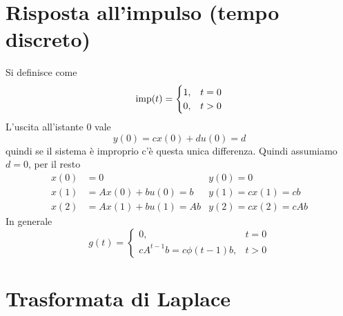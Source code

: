 \section{Risposta all'impulso (tempo discreto)}

Si definisce come
\begin{equation*}
	\operatorname{imp}(t) =\begin{cases}
	1, & t=0\\
	0, & t >0
	\end{cases}
\end{equation*}
L'uscita all'istante $0$ vale
\begin{equation*}
	y(0) =cx(0) +du(0) =d
\end{equation*}
quindi se il sistema è improprio c'è questa unica differenza. Quindi assumiamo $d=0$, per il resto
\begin{equation*}
	\begin{aligned}
		x(0) & =0                & y(0) =0          \\
		x(1) & =Ax(0) +bu(0) =b  & y(1) =cx(1) =cb  \\
		x(2) & =Ax(1) +bu(1) =Ab & y(2) =cx(2) =cAb 
	\end{aligned}
\end{equation*}
In generale
\begin{equation*}
	\boxed{g(t) =\begin{cases}
		0, & t=0\\
		cA^{t-1} b=c\phi (t-1) b, & t >0
		\end{cases}
	}
\end{equation*}

\section{Trasformata di Laplace}

